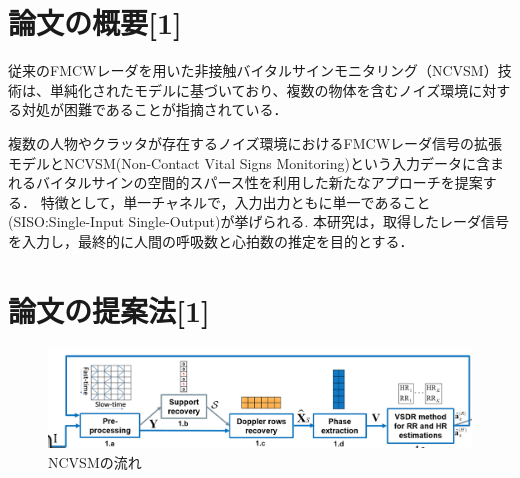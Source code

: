 \documentclass[dvipdfmx]{jsarticle}
\begin{document}
\section{論文の概要[1]}
従来のFMCWレーダを用いた非接触バイタルサインモニタリング（NCVSM）技術は、単純化されたモデルに基づいており、複数の物体を含むノイズ環境に対する対処が困難であることが指摘されている．

複数の人物やクラッタが存在するノイズ環境におけるFMCWレーダ信号の拡張モデルとNCVSM(Non-Contact Vital Signs Monitoring)という入力データに含まれるバイタルサインの空間的スパース性を利用した新たなアプローチを提案する．
特徴として，単一チャネルで，入力出力ともに単一であること(SISO:Single-Input Single-Output)が挙げられる.
本研究は，取得したレーダ信号を入力し，最終的に人間の呼吸数と心拍数の推定を目的とする．

\section{論文の提案法[1]}
\begin{figure}[H]
\begin{center}
\includegraphics[width=0.8\linewidth]{./img/NCVSM_diagram.png}
\end{center}
\caption{NCVSMの流れ}
\end{figure}
\end{document}
